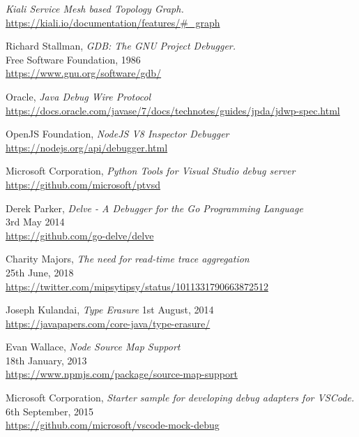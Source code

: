 \documentclass[12pt,pdftex,titlepage]{report}
\begin{document}
\begin{thebibliography}{69}
        \textit{Kiali Service Mesh based Topology Graph.} \\
        \url{https://kiali.io/documentation/features/#_graph}

        Richard Stallman, \textit{GDB: The GNU Project Debugger.} \\
        Free Software Foundation, 1986 \\
        \url{https://www.gnu.org/software/gdb/}

        Oracle, \textit{Java Debug Wire Protocol} \\
        \url{https://docs.oracle.com/javase/7/docs/technotes/guides/jpda/jdwp-spec.html}

        OpenJS Foundation, \textit{NodeJS V8 Inspector Debugger} \\
        \url{https://nodejs.org/api/debugger.html}

        Microsoft Corporation, \textit{Python Tools for Visual Studio debug server} \\
        \url{https://github.com/microsoft/ptvsd}

        Derek Parker, \textit{Delve - A Debugger for the Go Programming Language} \\
        3rd May 2014 \\
        \url{https://github.com/go-delve/delve}

        Charity Majors, \textit{The need for read-time trace aggregation} \\
        25th June, 2018 \\
        \url{https://twitter.com/mipsytipsy/status/1011331790663872512}

        Joseph Kulandai, \textit{Type Erasure}
        1st August, 2014 \\
        \url{https://javapapers.com/core-java/type-erasure/}

        Evan Wallace, \textit{Node Source Map Support} \\
        18th January, 2013 \\ 
        \url{https://www.npmjs.com/package/source-map-support}

        Microsoft Corporation, \textit{Starter sample for developing debug adapters for VSCode.} \\
        6th September, 2015 \\
        \url{https://github.com/microsoft/vscode-mock-debug}

    \end{thebibliography}
\end{document}
